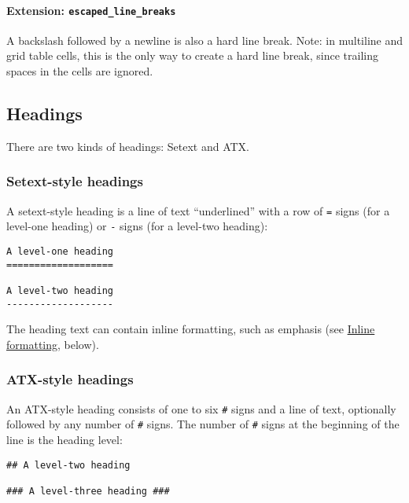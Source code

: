 \documentclass[
]{article}
\begin{document}
\hypertarget{extension-escaped_line_breaks}{%
\paragraph{\texorpdfstring{Extension:
\texttt{escaped\_line\_breaks}}{Extension: escaped\_line\_breaks}}\label{extension-escaped_line_breaks}}

A backslash followed by a newline is also a hard line break. Note: in
multiline and grid table cells, this is the only way to create a hard
line break, since trailing spaces in the cells are ignored.

\hypertarget{headings}{%
\subsection{Headings}\label{headings}}

There are two kinds of headings: Setext and ATX.

\hypertarget{setext-style-headings}{%
\subsubsection{Setext-style headings}\label{setext-style-headings}}

A setext-style heading is a line of text ``underlined'' with a row of
\texttt{=} signs (for a level-one heading) or \texttt{-} signs (for a
level-two heading):

\begin{verbatim}
A level-one heading
===================

A level-two heading
-------------------
\end{verbatim}

The heading text can contain inline formatting, such as emphasis (see
\protect\hyperlink{inline-formatting}{Inline formatting}, below).

\hypertarget{atx-style-headings}{%
\subsubsection{ATX-style headings}\label{atx-style-headings}}

An ATX-style heading consists of one to six \texttt{\#} signs and a line
of text, optionally followed by any number of \texttt{\#} signs. The
number of \texttt{\#} signs at the beginning of the line is the heading
level:

\begin{verbatim}
## A level-two heading

### A level-three heading ###
\end{verbatim}
\end{document}

